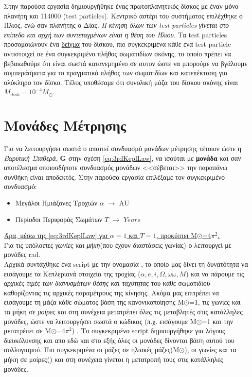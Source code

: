 
  Στην παρούσα εργασία δημιουργήθηκε ένας πρωτοπλανητικός δίσκος με έναν μόνο πλανήτη και 114000 {\en (test particles)}. Κεντρικό αστέρι του συστήματος επιλέχθηκε ο Ήλιος, ενώ σαν πλανήτης ο Δίας. {\it Η κίνηση όλων των {\en test particles} γίνεται στο επίπεδο και αρχή των συντεταγμένων είναι η θέση του Ήλιου}. Τα {\en test particles} προσομοιώνουν ένα \underline{δείγμα} του δίσκου, πιο συγκεκριμένα κάθε ένα {\en test particle} αντιστοιχεί σε ένα συγκεκριμένο πλήθος σωματιδίων σκόνης, το οποίο πρέπει να βεβαιωθούμε ότι είναι σωστά κατανεμημένο σε αυτον ώστε να μπορούμε να βγάλουμε συμπεράσματα για το πραγματικό πλήθος των σωματιδίων και κατεπέκταση για ολόκληρο τον δίσκο. Τέλος υποθέσαμε ότι συνολική μάζα του δίσκου σκόνης είναι $M_{disk}= 10^{-4} M_{\odot}$.
  
  \section{Μονάδες Μέτρησης}  
   
Για να λειτουργήσει σωστά  ο  \gr απαιτεί συνδυασμό μονάδων μέτρησης τέτοιον ώστε η {\it Βαρυτική Σταθερά}, \textbf{{\en G}} στην σχέση \eqref{eq:3rdKeplLaw}, να ισούται με {\bf μονάδα} και σαν αποτέλεσμα οποιοσδήποτε συνδυασμός μονάδων <<σέβεται>> την παραπάνω συνθήκη είναι αποδεκτός. Στην παρούσα εργασία επιλέξαμε τον συγκεκριμένο συνδυασμό:

   \begin{itemize}
     \item Μεγάλοι Ημιάξονες Τροχιών $\alpha$ $\rightarrow$ {\en AU}
     \item Περίοδοι Περιφοράς Σωμάτων $T$ $\rightarrow$  $Years$
   \end{itemize}
   \underline{Άρα, μέσω της \eqref{eq:3rdKeplLaw} για $\alpha=1$ και $Τ=1$, προκύπτει Μ$\odot$=4$\pi^2$.}\\
    
Για τις υπόλοιπες {\it γωνίες} και {\it μήκη}(που έχουν διαστάσεις γωνίας) ο {} λειτουργεί με μονάδες {\en rad}.\\
   
Αρχικά συντάχθηκε ένα {\en script} με την ονομασία {}, το οποίο μας δίνει τη δυνατότητα να εισάγουμε τα Κεπλεριανά στοιχεία της τροχίας ($ \alpha, e, i, \Omega, ω\omega ,Μ$) και να πάρουμε τις {\it αρχικές τιμές των διανυσμάτων  θέσης και ταχύτητας} του κάθε σωματιδίου καθορίζοντας τις αρχικές παραμέτρους της κίνησης. Ακόμα μας επιτρέπει να εισάγουμε τη μάζα κάθε σώματος  βάση της κανονικοποίησης Μ$\odot$=1, τις γωνίες και τα μήκη σε {\it μοίρες} και στη συνέχεια μετατρέπει όλες τις μεταβλητές στις κατάλληλες μονάδες, ώστε να λειτουργήσει σωστά ο κώδικας (π.χ. εισάγουμε Μ$\odot$=1 και την μετατρέπει σε Μ$\odot$=4$\pi^2$) .
Το συγκεκριμένο {\en script} δημιουργήθηκε για λόγους διευκόλυνσης και απο εδώ και στο εξής όλες οι μονάδες δίνονται βάση αυτού του συλλογισμού. Πιο συγκεκριμένα οι μάζες σε ηλιακές μάζες(Μ$\odot$), οι γωνίες και τα μήκη σε μοίρες(\degree) και στη συνέχεια γίνεται η μετατροπή τους στις κατάλληλες μονάδες.
  
